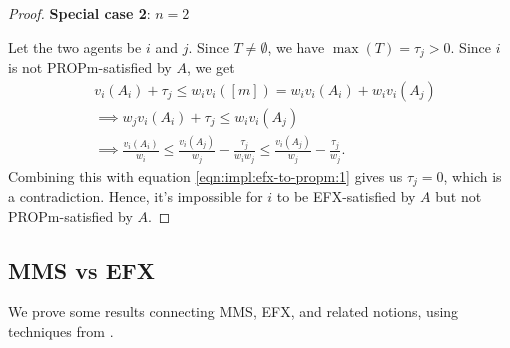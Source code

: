 \begin{proof}
\textbf{Special case 2}: $n=2$

Let the two agents be $i$ and $j$. Since $T \neq \emptyset$, we have $\max(T) = \tau_j > 0$.
Since $i$ is not PROPm-satisfied by $A$, we get
\begin{align}
& v_i(A_i) + \tau_j \le w_iv_i([m]) = w_iv_i(A_i) + w_iv_i(A_j)
\\ &\implies w_jv_i(A_i) + \tau_j \le w_iv_i(A_j)
\\ &\implies \frac{v_i(A_i)}{w_i} \le \frac{v_i(A_j)}{w_j} - \frac{\tau_j}{w_iw_j}
    \le \frac{v_i(A_j)}{w_j} - \frac{\tau_j}{w_j}.
\end{align}
Combining this with equation \eqref{eqn:impl:efx-to-propm:1} gives us $\tau_j = 0$, which is a contradiction.
Hence, it's impossible for $i$ to be EFX-satisfied by $A$ but not PROPm-satisfied by $A$.
\end{proof}

\subsection{MMS vs EFX}
\label{sec:impls-extra:mms-vs-efx}

We prove some results connecting MMS, EFX, and related notions,
using techniques from \cite{plaut2020almost,caragiannis2023new}.

